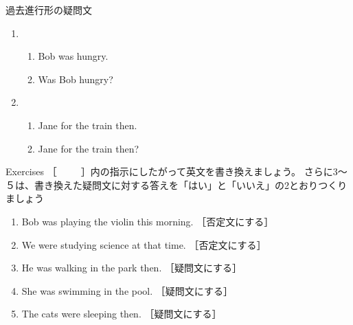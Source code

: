 \documentclass[aspectratio=169,xcolor={dvipsnames,table}]{beamer}
\begin{document}
\begin{frame}[plain]{過去進行形の疑問文}
  \begin{enumerate}
  \item \begin{enumerate}
	 \item<1-> Bob was hungry.
	 \item<2-> Was Bob hungry?
	\end{enumerate}
  \item \begin{enumerate}
	 \item<3-> Jane  for the train then.
	 \item<4->  Jane  for the train then?
	\end{enumerate}

 \end{enumerate}
\hfill{}

\end{frame}
\begin{frame}[plain]{Exercises}
 ［~~~~~］内の指示にしたがって英文を書き換えましょう。
さらに3～５は、書き換えた疑問文に対する答えを「はい」と「いいえ」の2とおりつくりましょう\hfill{}

\begin{enumerate}
 \item Bob was playing the violin this morning. ［否定文にする］\\
 \item We were studying science at that time. ［否定文にする］\\
 \item He was walking in the park then. ［疑問文にする］\\
 \item She was swimming in the pool. ［疑問文にする］\\
 \item The cats were sleeping then. ［疑問文にする］\\

\end{enumerate}

\end{frame}
\end{document}
